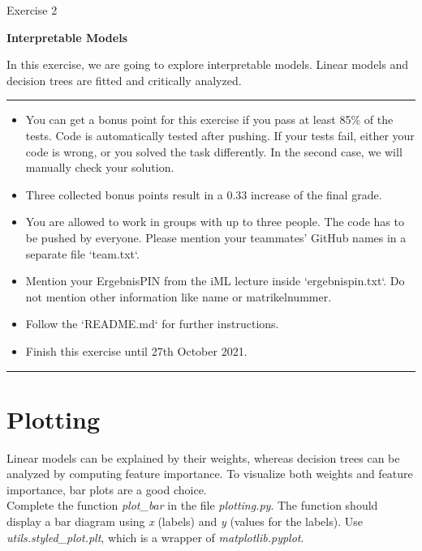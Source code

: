 \documentclass[a4paper]{article}
\begin{document}
{\noindent\LARGE Exercise 2\par}
\vspace{8pt}
{\noindent\huge\textbf{Interpretable Models}}
\vspace{20pt}

\noindent
In this exercise, we are going to explore interpretable models. Linear models and decision trees are fitted and critically analyzed.

\vspace{10pt}
\par\noindent\rule{\textwidth}{0.2pt}
\begin{itemize}
    \item You can get a bonus point for this exercise if you pass at least 85\% of the tests. Code is automatically tested after pushing. If your tests fail, either your code is wrong, or you solved the task differently. In the second case, we will manually check your solution.
    \item Three collected bonus points result in a 0.33 increase of the final grade.
    \item You are allowed to work in groups with up to three people. The code has to be pushed by
everyone. Please mention your teammates' GitHub names in a separate file `team.txt`.
    \item Mention your ErgebnisPIN from the iML lecture inside `ergebnispin.txt`. Do not mention other information like name or matrikelnummer.
    \item Follow the `README.md` for further instructions.
    \item Finish this exercise until 27th October 2021.
\end{itemize}
\par\noindent\rule{\textwidth}{0.2pt}


\section{Plotting}

\noindent Linear models can be explained by their weights, whereas decision trees can be analyzed by computing feature importance. To visualize both weights and feature importance, bar plots are a good choice.\\

\noindent Complete the function \textit{plot\_bar} in the file \textit{plotting.py}. The function should display a bar diagram using \textit{x} (labels) and \textit{y} (values for the labels). Use \textit{utils.styled\_plot.plt}, which is a wrapper of \textit{matplotlib.pyplot}.
\end{document}
